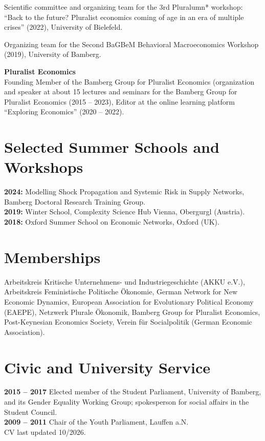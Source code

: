 \documentclass[margin]{res}
\begin{document}
\begin{resume}
	
	Scientific committee and organizing team for the 3rd Pluralumn* workshop: ``Back to the future? Pluralist economics coming of age in an era of multiple crises'' (2022), University of Bielefeld. 
	
	Organizing team for the Second BaGBeM Behavioral Macroeconomics Workshop (2019), University of Bamberg.
	
	\textbf{Pluralist Economics}\\
	Founding Member of the Bamberg Group for Pluralist Economics
	(organization and speaker at about 15 lectures and seminars for the Bamberg Group for Pluralist Economics  (2015 -- 2023), Editor at the online learning platform ``Exploring Economics'' (2020 -- 2022).\\
	
	
	\section{Selected Summer Schools and Workshops}
	\textbf{2024:} Modelling Shock Propagation and Systemic Risk in Supply Networks, Bamberg Doctoral Research Training Group.\\
	\textbf{2019:} Winter School, Complexity Science Hub Vienna, Obergurgl (Austria).\\
	\textbf{2018:} Oxford Summer School on Economic Networks, Oxford (UK).\\
	
	\section{Memberships}
	Arbeitskreis Kritische Unternehmens- und Industriegeschichte (AKKU e.V.), Arbeitskreis Feministische Politische \"Okonomie, German Network for New Economic Dynamics, European Association for Evolutionary Political Economy (EAEPE), Netzwerk Plurale \"Okonomik, Bamberg Group for Pluralist Economics, Post-Keynesian Economics Society, Verein f\"ur Socialpolitik (German Economic Association).\\
	
	\section{Civic and University Service}
	\textbf{2015 -- 2017} Elected member of the Student Parliament, University of Bamberg, and its Gender Equality Working Group; spokesperson for social affairs in the Student Council.\\
	\textbf{2009 -- 2011} Chair of the Youth Parliament, Lauffen a.N.\\
	
	\enlargethispage{3\baselineskip}
	\hfill CV last updated 10/2026.
\end{resume}
\end{document}
